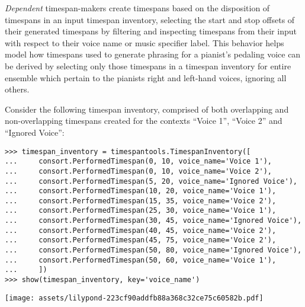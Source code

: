 \emph{Dependent} timespan-makers create timespans based on the disposition of
timespans in an input timespan inventory, selecting the start and stop offsets
of their generated timespans by filtering and inspecting timespans from their
input with respect to their voice name or music specifier label. This behavior
helps model how timespans used to generate phrasing for a pianist's pedaling
voice can be derived by selecting only those timespans in a timespan inventory
for entire ensemble which pertain to the pianists right and left-hand voices,
ignoring all others.

Consider the following timespan inventory, comprised of both overlapping and
non-overlapping timespans created for the contexts \enquote{Voice 1},
\enquote{Voice 2} and \enquote{Ignored Voice}:

\begin{comment}
<abjad>
timespan_inventory = timespantools.TimespanInventory([
    consort.PerformedTimespan(0, 10, voice_name='Voice 1'),
    consort.PerformedTimespan(0, 10, voice_name='Voice 2'),
    consort.PerformedTimespan(5, 20, voice_name='Ignored Voice'),
    consort.PerformedTimespan(10, 20, voice_name='Voice 1'),
    consort.PerformedTimespan(15, 35, voice_name='Voice 2'),
    consort.PerformedTimespan(25, 30, voice_name='Voice 1'),
    consort.PerformedTimespan(30, 45, voice_name='Ignored Voice'),
    consort.PerformedTimespan(40, 45, voice_name='Voice 2'),
    consort.PerformedTimespan(45, 75, voice_name='Voice 2'),
    consort.PerformedTimespan(50, 80, voice_name='Ignored Voice'),
    consort.PerformedTimespan(50, 60, voice_name='Voice 1'),
    ])
show(timespan_inventory, key='voice_name')
</abjad>
\end{comment}

\begin{abjadbookoutput}
\begin{singlespacing}
\vspace{-0.5\baselineskip}
\begin{lstlisting}
>>> timespan_inventory = timespantools.TimespanInventory([
...     consort.PerformedTimespan(0, 10, voice_name='Voice 1'),
...     consort.PerformedTimespan(0, 10, voice_name='Voice 2'),
...     consort.PerformedTimespan(5, 20, voice_name='Ignored Voice'),
...     consort.PerformedTimespan(10, 20, voice_name='Voice 1'),
...     consort.PerformedTimespan(15, 35, voice_name='Voice 2'),
...     consort.PerformedTimespan(25, 30, voice_name='Voice 1'),
...     consort.PerformedTimespan(30, 45, voice_name='Ignored Voice'),
...     consort.PerformedTimespan(40, 45, voice_name='Voice 2'),
...     consort.PerformedTimespan(45, 75, voice_name='Voice 2'),
...     consort.PerformedTimespan(50, 80, voice_name='Ignored Voice'),
...     consort.PerformedTimespan(50, 60, voice_name='Voice 1'),
...     ])
>>> show(timespan_inventory, key='voice_name')
\end{lstlisting}
\noindent\texttt{[image: assets/lilypond-223cf90addfb88a368c32ce75c60582b.pdf]}
\end{singlespacing}
\end{abjadbookoutput}

